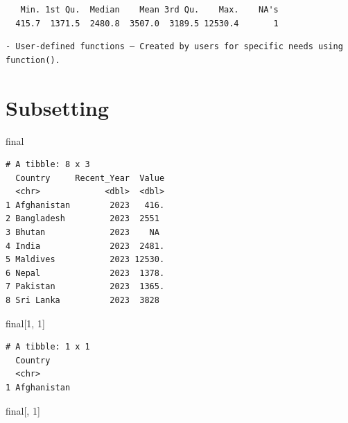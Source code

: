 \documentclass[
  letterpaper,
  DIV=11,
  numbers=noendperiod]{scrreprt}
\newenvironment{Shaded}{\begin{snugshade}}{\end{snugshade}}
\newcommand{\DecValTok}[1]{\textcolor[rgb]{0.68,0.00,0.00}{#1}}
\newcommand{\FunctionTok}[1]{\textcolor[rgb]{0.28,0.35,0.67}{#1}}
\newcommand{\NormalTok}[1]{\textcolor[rgb]{0.00,0.23,0.31}{#1}}
\newcommand{\SpecialCharTok}[1]{\textcolor[rgb]{0.37,0.37,0.37}{#1}}
\begin{document}
\begin{Shaded}
\end{Shaded}

\begin{verbatim}
   Min. 1st Qu.  Median    Mean 3rd Qu.    Max.    NA's 
  415.7  1371.5  2480.8  3507.0  3189.5 12530.4       1 
\end{verbatim}

\begin{verbatim}
- User-defined functions – Created by users for specific needs using function().
\end{verbatim}

\section{Subsetting}\label{subsetting}

\begin{Shaded}
\begin{Highlighting}[]
\NormalTok{final}
\end{Highlighting}
\end{Shaded}

\begin{verbatim}
# A tibble: 8 x 3
  Country     Recent_Year  Value
  <chr>             <dbl>  <dbl>
1 Afghanistan        2023   416.
2 Bangladesh         2023  2551 
3 Bhutan             2023    NA 
4 India              2023  2481.
5 Maldives           2023 12530.
6 Nepal              2023  1378.
7 Pakistan           2023  1365.
8 Sri Lanka          2023  3828 
\end{verbatim}

\begin{Shaded}
\begin{Highlighting}[]
\NormalTok{final[}\DecValTok{1}\NormalTok{, }\DecValTok{1}\NormalTok{]}
\end{Highlighting}
\end{Shaded}

\begin{verbatim}
# A tibble: 1 x 1
  Country    
  <chr>      
1 Afghanistan
\end{verbatim}

\begin{Shaded}
\begin{Highlighting}[]
\NormalTok{final[, }\DecValTok{1}\NormalTok{]}
\end{Highlighting}
\end{Shaded}
\end{document}
